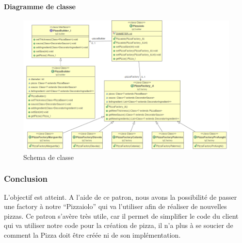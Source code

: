 \documentclass[french,]{article}
\let\oldparagraph\paragraph
\renewcommand{\paragraph}[1]{\oldparagraph{#1}\mbox{}}
\begin{document}
\paragraph{Diagramme de classe}\label{diagramme-de-classe}

\begin{figure}[htbp]
\centering
\includegraphics{factory.png}
\caption{Schema de classe}
\end{figure}

\subsubsection{Conclusion}\label{conclusion}

L'objectif est atteint. A l'aide de ce patron, nous avons la possibilité
de passer une factory à notre ``Pizzaiolo'' qui va l'utiliser afin de
réaliser de nouvelles pizzas. Ce patron s'avère très utile, car il
permet de simplifier le code du client qui va utiliser notre code pour
la création de pizza, il n'a plus à se soucier de comment la Pizza doit
être créée ni de son implémentation.
\end{document}
